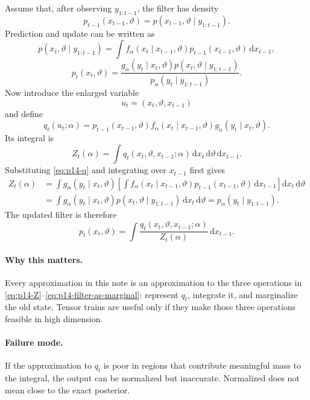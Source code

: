 \documentclass[11pt]{article}
\newcommand{\dd}{\mathrm{d}}
\renewcommand{\[}{\begin{equation}}
\renewcommand{\]}{\end{equation}}
\theoremstyle{definition}
\theoremstyle{remark}
\begin{document}
Assume that, after observing \(y_{1:t-1}\), the filter has density
\[
  p_{t-1}(x_{t-1},\vartheta)
  =
  p(x_{t-1},\vartheta\mid y_{1:t-1}).
\]
Prediction and update can be written as
\[
  p(x_t,\vartheta\mid y_{1:t-1})
  =
  \int f_\alpha(x_t\mid x_{t-1},\vartheta)
       p_{t-1}(x_{t-1},\vartheta)\,\dd x_{t-1},
  \label{eq:p14-prediction}
\]
\[
  p_t(x_t,\vartheta)
  =
  \frac{
  g_\alpha(y_t\mid x_t,\vartheta)
  p(x_t,\vartheta\mid y_{1:t-1})}
  {p_\alpha(y_t\mid y_{1:t-1})}.
  \label{eq:p14-update}
\]
Now introduce the enlarged variable
\[
  u_t=(x_t,\vartheta,x_{t-1})
\]
and define
\[
  q_t(u_t;\alpha)
  =
  p_{t-1}(x_{t-1},\vartheta)
  f_\alpha(x_t\mid x_{t-1},\vartheta)
  g_\alpha(y_t\mid x_t,\vartheta).
  \label{eq:p14-q}
\]
Its integral is
\[
  Z_t(\alpha)
  =
  \int q_t(x_t,\vartheta,x_{t-1};\alpha)
  \,\dd x_t\,\dd\vartheta\,\dd x_{t-1}.
  \label{eq:p14-Z}
\]
Substituting \eqref{eq:p14-q} and integrating over \(x_{t-1}\) first gives
\[
\begin{aligned}
  Z_t(\alpha)
  &=
  \int g_\alpha(y_t\mid x_t,\vartheta)
  \left[
  \int f_\alpha(x_t\mid x_{t-1},\vartheta)
  p_{t-1}(x_{t-1},\vartheta)\,\dd x_{t-1}
  \right]
  \dd x_t\,\dd\vartheta \\
  &=
  \int g_\alpha(y_t\mid x_t,\vartheta)
  p(x_t,\vartheta\mid y_{1:t-1})\,\dd x_t\,\dd\vartheta
  =
  p_\alpha(y_t\mid y_{1:t-1}).
\end{aligned}
\]
The updated filter is therefore
\[
  p_t(x_t,\vartheta)
  =
  \int
  \frac{q_t(x_t,\vartheta,x_{t-1};\alpha)}
       {Z_t(\alpha)}
  \,\dd x_{t-1}.
  \label{eq:p14-filter-as-marginal}
\]

\paragraph{Why this matters.}
Every approximation in this note is an approximation to the three operations
in \eqref{eq:p14-Z}--\eqref{eq:p14-filter-as-marginal}: represent \(q_t\),
integrate it, and marginalize the old state.  Tensor trains are useful only if
they make those three operations feasible in high dimension.

\paragraph{Failure mode.}
If the approximation to \(q_t\) is poor in regions that contribute meaningful
mass to the integral, the output can be normalized but inaccurate.  Normalized
does not mean close to the exact posterior.
\end{document}
